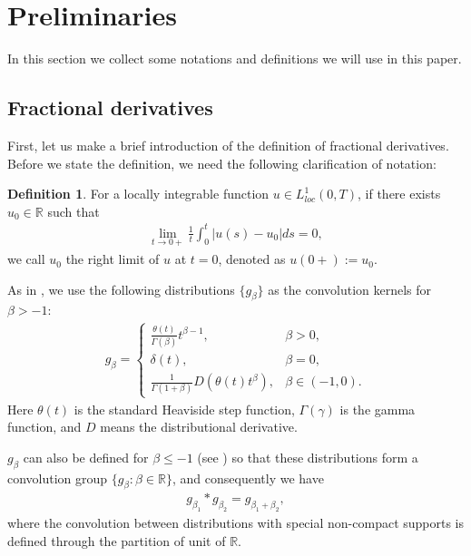\documentclass[12pt]{amsart}%
\theoremstyle{definition}
\newtheorem{definition}[thm]{Definition}
\theoremstyle{remark}
\renewcommand{\le}{\leqslant}
\begin{document}
\section{Preliminaries}\label{sec:pre}
In this section we collect some notations and definitions we will use in this paper. 
\subsection{Fractional derivatives}
First, let us make a brief introduction of the definition of fractional derivatives. Before we state the definition, we need the following clarification of notation:
\begin{definition}\label{def:rightlimit}
For a locally integrable function $u\in L_{loc}^1(0, T)$, if there exists $u_0\in\mathbb{R}$ such that 
\begin{gather}
\lim_{t\to 0+}\frac{1}{t}\int_0^t|u(s)-u_0|ds=0,
\end{gather}
we call $u_0$ the right limit of $u$ at $t=0$, denoted as $u(0+):=u_0$.
\end{definition}


As in \cite{liliu16}, we use the following distributions $\{g_\beta\}$ as the convolution kernels for $\beta>-1$:
\begin{gather*}
g_{\beta}=\displaystyle
\begin{cases}
\frac{\theta(t)}{\Gamma(\beta)}t^{\beta-1},& \beta>0,\\
\delta(t), &\beta=0,\\
\frac{1}{\Gamma(1+\beta)}D\left(\theta(t)t^{\beta}\right), & \beta\in (-1, 0).
\end{cases}
\end{gather*} 
Here $\theta(t)$ is the standard Heaviside step function, $\Gamma(\gamma)$ is the gamma function, and $D$ means the distributional derivative. 

$g_{\beta}$ can also be defined for $\beta\le -1$ (see \cite{liliu16}) so that these distributions form a convolution group $\{g_{\beta}: \beta\in\mathbb{R}\}$, and consequently we have 
\begin{gather}\label{eq:group}
g_{\beta_1}*g_{\beta_2}=g_{\beta_1+\beta_2},
\end{gather}
where the convolution between distributions with special non-compact supports is defined through the partition of unit of $\mathbb{R}$.
\end{document}
